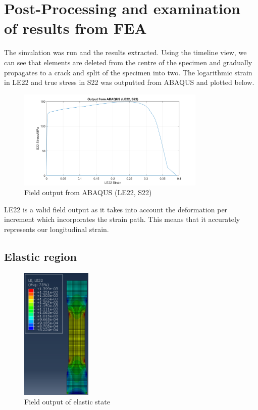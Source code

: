 \documentclass[11pt]{article}
\numberwithin{equation}{section}
\begin{document}
\section{Post-Processing and examination of results from FEA}
The simulation was run and the results extracted. Using the timeline view, we can see that elements are deleted from the centre of the specimen and gradually propagates to a crack and split of the specimen into two. The logarithmic strain in LE22 and true stress in S22 was outputted from ABAQUS and plotted below.
\begin{figure}[H]
    \centering
    \includegraphics[width = 0.8\textwidth]{./img/s22Strain.png}
    \caption{Field output from ABAQUS (LE22, S22)}
\end{figure}
LE22 is a valid field output as it takes into account the deformation per increment which incorporates the strain path. This means that it accurately represents our longitudinal strain. 
\subsection{Elastic region}
\begin{figure}[H]
    \centering
    \includegraphics[width = 0.3\textwidth]{./img/elastic.png}
    \caption{Field output of elastic state}
\end{figure}
\end{document}

